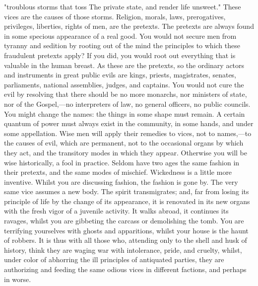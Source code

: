 "troublous storms that toss
The private state, and render life unsweet."
These vices are the causes of those storms. Religion, morals, laws, prerogatives, privileges, liberties, rights of men, are the pretexts. The pretexts are always found in some specious appearance of a real good. You would not secure men from tyranny and sedition by rooting out of the mind the principles to which these fraudulent pretexts apply? If you did, you would root out everything that is valuable in the human breast. As these are the pretexts, so the ordinary actors and instruments in great public evils are kings, priests, magistrates, senates, parliaments, national assemblies, judges, and captains. You would not cure the evil by resolving that there should be no more monarchs, nor ministers of state, nor of the Gospel,—no interpreters of law, no general officers, no public councils. You might change the names: the things in some shape must remain. A certain quantum of power must always exist in the community, in some hands, and under some appellation. Wise men will apply their remedies to vices, not to names,—to the causes of evil, which are permanent, not to the occasional organs by which they act, and the transitory modes in which they appear. Otherwise you will be wise historically, a fool in practice. Seldom have two ages the same fashion in their pretexts, and the same modes of mischief. Wickedness is a little more inventive. Whilst you are discussing fashion, the fashion is gone by. The very same vice assumes a new body. The spirit transmigrates; and, far from losing its principle of life by the change of its appearance, it is renovated in its new organs with the fresh vigor of a juvenile activity. It walks abroad, it continues its ravages, whilst you are gibbeting the carcass or demolishing the tomb. You are terrifying yourselves with ghosts and apparitions, whilst your house is the haunt of robbers. It is thus with all those who, attending only to the shell and husk of history, think they are waging war with intolerance, pride, and cruelty, whilst, under color of abhorring the ill principles of antiquated parties, they are authorizing and feeding the same odious vices in different factions, and perhaps in worse.

